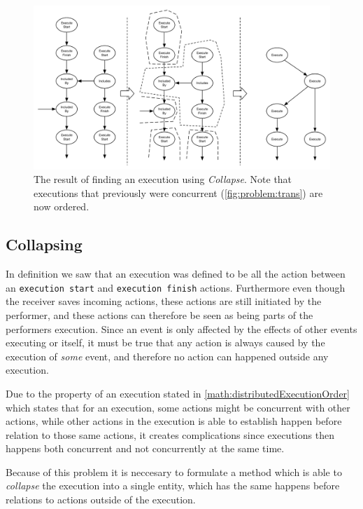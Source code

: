 	\begin{figure}
		\centering
		\includegraphics[width=\textwidth]{6orderofexecution/images/collapse.pdf}
		\caption{The result of finding an execution using \textit{Collapse}. Note that executions that previously were concurrent (\autoref{fig:problem:trans}) are now ordered.}
		\label{fig:problem:collapse}
	\end{figure}
	
	\subsection{Collapsing}
	In definition  we saw that an execution was defined to be all the action between an \texttt{execution start} and \texttt{execution finish} actions. Furthermore even though the receiver  saves incoming actions, these actions are still initiated by the performer, and these actions can therefore be seen as being parts of the performers execution. Since an event is only affected by the effects of other events executing or itself, it must be true that any action is always caused by the execution of \textit{some} event, and therefore no action can happened outside any execution.
	
	
	\newpar 
	Due to the property of an execution stated in \ref{math:distributedExecutionOrder} which states that for an execution, some actions might be concurrent with other actions, while other actions in the execution is able to establish happen before relation to those same actions, it creates complications since executions then happens both concurrent and not concurrently at the same time. 
	
	Because of this problem it is neccesary to formulate a method which is able to \textit{collapse} the execution into a single entity, which has the same happens before relations to actions outside of the execution.
	
